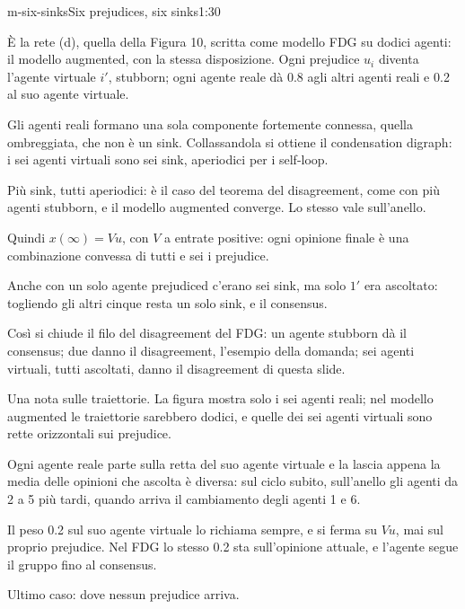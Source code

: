 \begin{slidetre}{m-six-sinks}{Six prejudices, six sinks}{1:30}
  \begin{discorso}
    \item È la rete (d), quella della Figura 10, scritta come modello FDG su dodici agenti: il modello augmented, con la stessa disposizione. Ogni prejudice $u_i$ diventa l'agente virtuale $i'$, stubborn; ogni agente reale dà 0.8 agli altri agenti reali e 0.2 al suo agente virtuale.
    \item Gli agenti reali formano una sola componente fortemente connessa, quella ombreggiata, che non è un sink. Collassandola si ottiene il condensation digraph: i sei agenti virtuali sono sei sink, aperiodici per i self-loop.
    \item Più sink, tutti aperiodici: è il caso del teorema del disagreement, come con più agenti stubborn, e il modello augmented converge. Lo stesso vale sull'anello.
    \item \clic Quindi $x(\infty)=Vu$, con $V$ a entrate positive: ogni opinione finale è una combinazione convessa di tutti e sei i prejudice.
    \item Anche con un solo agente prejudiced c'erano sei sink, ma solo $1'$ era ascoltato: togliendo gli altri cinque resta un solo sink, e il consensus.
    \item Così si chiude il filo del disagreement del FDG: un agente stubborn dà il consensus; due danno il disagreement, l'esempio della domanda; sei agenti virtuali, tutti ascoltati, danno il disagreement di questa slide.
    \item \clic Una nota sulle traiettorie. La figura mostra solo i sei agenti reali; nel modello augmented le traiettorie sarebbero dodici, e quelle dei sei agenti virtuali sono rette orizzontali sui prejudice.
    \item Ogni agente reale parte sulla retta del suo agente virtuale e la lascia appena la media delle opinioni che ascolta è diversa: sul ciclo subito, sull'anello gli agenti da 2 a 5 più tardi, quando arriva il cambiamento degli agenti 1 e 6.
    \item Il peso 0.2 sul suo agente virtuale lo richiama sempre, e si ferma su $Vu$, mai sul proprio prejudice. Nel FDG lo stesso 0.2 sta sull'opinione attuale, e l'agente segue il gruppo fino al consensus.
    \item Ultimo caso: dove nessun prejudice arriva.
  \end{discorso}
\end{slidetre}

